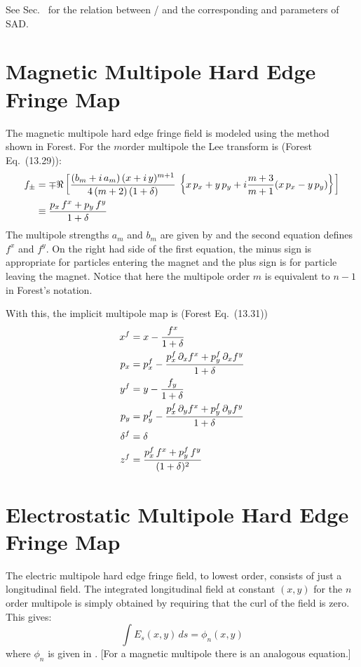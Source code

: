 See Sec.~ for the relation between  /  and
the corresponding  and  parameters of SAD.

\section{Magnetic Multipole Hard Edge Fringe Map}

The magnetic multipole hard edge fringe field is modeled using the method shown in
Forest\cite{b:forest}. For the $m$\Th order multipole the Lee transform 
is (Forest Eq.~(13.29)):
\begin{align}
  f_\pm &= \mp \Re \left[ \frac{(b_m + i \, a_m) \, 
    (x + i \, y)^{m+1}}{4 \, (m + 2) \, (1 + \delta)} \,
    \left\{ x \, p_x + y \, p_y + i \frac{m+3}{m+1} 
    (x \, p_x - y \, p_y) \right\} \right] \nonumber \\
  &\equiv \frac{p_x \, f^x + p_y \, f^y}{1 + \delta}
\end{align}
The multipole strengths $a_m$ and $b_m$ are given by 
and the second equation defines $f^x$ and $f^y$. On the right had side of the first
equation, the minus sign is appropriate for particles entering the magnet and the
plus sign is for particle leaving the magnet.
Notice that here the multipole order $m$ is equivalent to $n-1$ in Forest's notation.

With this, the implicit multipole map is (Forest Eq.~(13.31))
\begin{align}
  x^f &= x - \frac{f^x}{1 + \delta} \nonumber \\
  p_x &= p_x^f - \frac{p_x^f \, \partial_x f^x + p_y^f \, \partial_x f^y}{1 + \delta} \nonumber \\
  y^f &= y - \frac{f_y}{1 + \delta} \\
  p_y &= p_y^f - \frac{p_x^f \, \partial_y f^x + p_y^f \, \partial_y f^y}{1 + \delta} \nonumber \\
  \delta^f &= \delta \nonumber \\
  z^f &=\frac{p_x^f \, f^x + p_y^f \, f^y}{(1 + \delta)^2} \nonumber
\end{align}

\section{Electrostatic Multipole Hard Edge Fringe Map}
\label{s:spin.hard.fringe}

The electric multipole hard edge fringe field, to lowest order, consists of just a longitudinal
field. The integrated longitudinal field at constant $(x,y)$ for the $n$\Th order multipole is
simply obtained by requiring that the curl of the field is zero.  This gives:
\begin{equation}
  \int E_s(x,y) \, ds = \phi_n(x,y)
\end{equation}
where $\phi_n$ is given in . [For a magnetic multipole there is an analogous
equation.]

